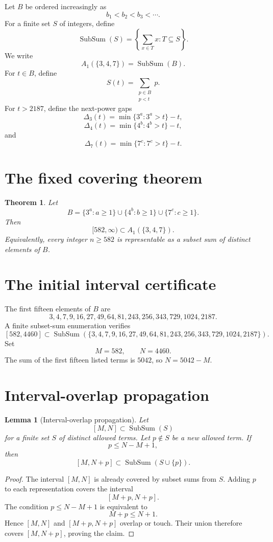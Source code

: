 \documentclass[11pt]{article}
\newtheorem{theorem}{Theorem}
\newtheorem{lemma}{Lemma}
\DeclareMathOperator{\SubSum}{SubSum}
\begin{document}
Let \(B\) be ordered increasingly as
\[
b_1<b_2<b_3<\cdots .
\]
For a finite set \(S\) of integers, define
\[
\SubSum(S)=\left\{\sum_{x\in T}x:T\subseteq S\right\}.
\]
We write
\[
A_1(\{3,4,7\})=\SubSum(B).
\]
For \(t\in B\), define
\[
S(t)=\sum_{\substack{p\in B\\ p<t}}p.
\]
For \(t>2187\), define the next-power gaps
\[
\Delta_3(t)=\min\{3^a:3^a>t\}-t,
\]
\[
\Delta_4(t)=\min\{4^b:4^b>t\}-t,
\]
and
\[
\Delta_7(t)=\min\{7^c:7^c>t\}-t.
\]

\section{The fixed covering theorem}

\begin{theorem}
Let
\[
B=\{3^a:a\ge1\}\cup\{4^b:b\ge1\}\cup\{7^c:c\ge1\}.
\]
Then
\[
[582,\infty)\subset A_1(\{3,4,7\}).
\]
Equivalently, every integer \(n\ge582\) is representable as a subset sum of
distinct elements of \(B\).
\end{theorem}

\section{The initial interval certificate}

The first fifteen elements of \(B\) are
\[
3,4,7,9,16,27,49,64,81,243,256,343,729,1024,2187.
\]
A finite subset-sum enumeration verifies
\[
[582,4460]\subset
\SubSum(\{3,4,7,9,16,27,49,64,81,243,256,343,729,1024,2187\}).
\]
Set
\[
M=582,\qquad N=4460.
\]
The sum of the first fifteen listed terms is \(5042\), so \(N=5042-M\).

\section{Interval-overlap propagation}

\begin{lemma}[Interval-overlap propagation]
Let
\[
[M,N]\subset \SubSum(S)
\]
for a finite set \(S\) of distinct allowed terms. Let \(p\notin S\) be a new allowed
term. If
\[
p\le N-M+1,
\]
then
\[
[M,N+p]\subset \SubSum(S\cup\{p\}).
\]
\end{lemma}

\begin{proof}
The interval \([M,N]\) is already covered by subset sums from \(S\). Adding \(p\)
to each representation covers the interval
\[
[M+p,N+p].
\]
The condition \(p\le N-M+1\) is equivalent to
\[
M+p\le N+1.
\]
Hence \([M,N]\) and \([M+p,N+p]\) overlap or touch. Their union therefore covers
\([M,N+p]\), proving the claim.
\end{proof}
\end{document}
